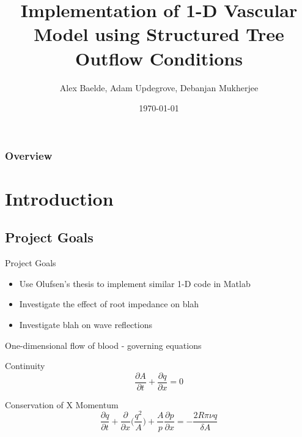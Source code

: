 \documentclass{beamer}
\title[]{Implementation of 1-D Vascular Model using Structured Tree Outflow Conditions} %
\author{Alex Baelde, Adam Updegrove, Debanjan Mukherjee} %
\date{\today} %
\newcommand{\partder}[2]{\frac{\partial #1}{\partial #2}}
\begin{document}
\begin{frame}
\titlepage %
\end{frame}

\begin{frame}
\frametitle{Overview} %
\tableofcontents %
\end{frame}

\section{Introduction}

\subsection{Project Goals}


\begin{frame}{Project Goals}

\begin{itemize}
	\item
	Use Olufsen's thesis to implement similar 1-D code in Matlab
	\item
	Investigate the effect of root impedance on blah
	\item
	Investigate blah on wave reflections
\end{itemize}


\end{frame}


\begin{frame}{One-dimensional flow of blood - governing equations}
	\begin{block}{Continuity}
		\begin{equation}
			\label{continuity}
			\partder{A}{t} + \partder{q}{x} = 0
		\end{equation}
	\end{block}

	\begin{block}{Conservation of X Momentum}
		\begin{equation}
			\label{consxmomentum}
			\partder{q}{t} + \partder{}{x}\Bigg(\frac{q^2}{A}\Bigg) + \frac{A}{p}\partder{p}{x} = -\frac{2R\pi \nu q}{\delta A}
		\end{equation}
	\end{block}
	
\end{frame}
\end{document}
